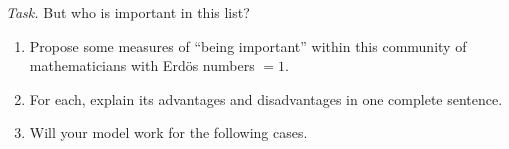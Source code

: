 \emph{Task.} But who is important in this list?

\begin{enumerate}[label=\emph{\arabic*.}]
	\item Propose some measures of ``being important'' within this community of mathematicians with Erd{\"o}s numbers $ = 1 $.
	\item For each, explain its advantages and disadvantages in one complete sentence.
	
	\item Will your model work for the following cases.
\end{enumerate}

\def\star#1#2{
  \draw (#1,#2) node {\tikzcircle[black,fill=black]{1pt}};
  \foreach \a in {0,60,120,180,240,300} {
    \draw (#1,#2) -- ({#1+cos(\a)},{#2+sin(\a)}) node {\tikzcircle[black,fill=black]{1pt}};
  }
}
\def\starseven#1#2#3{
  \draw (#1,#2) node {\tikzcircle[black,fill=black]{1pt}};
  \foreach \a in {31.4,82.8,134.2,185.6,237,288.4,339.8} {
    \draw (#1,#2) -- ({#1+cos(\a+#3)},{#2+sin(\a+#3)}) node {\tikzcircle[black,fill=black]{1pt}};
  }
}


